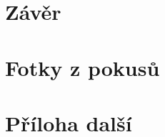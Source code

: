 \documentclass[12pt]{report}			%
\begin{document}
	\chapter*{Závěr}
	
		\lipsum[1]
	
	\nocite{*}
    	\printbibliography					
    \printglossary[title={Zkratky}]		
    \listoffigures					
    \listoftables						

    \begin{appendices}
	\chapter{Fotky z pokusů}	
	\lipsum[1]
	\chapter{Příloha další }
	\end{appendices}
\end{document}
